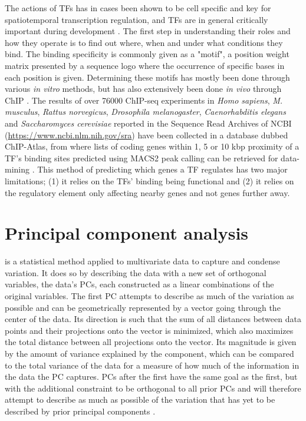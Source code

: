 The actions of \acp{TF} has in cases been shown to be cell specific and key for spatiotemporal transcription regulation, and \acp{TF} are in general critically important during development \cite{Spitz2012, Gurdon2016}. The first step in understanding their roles and how they operate is to  find out where, when and under what conditions they bind. The binding specificity is commonly given as a "motif", a position weight matrix presented by a sequence logo where the occurrence of specific bases in each position is given. Determining these motifs has mostly been done through various \textit{in vitro} methods, but has also extensively been done \textit{in vivo} through \ac{ChIP} \cite{lambert2018}. The results of over 76000 \ac{ChIP-seq} experiments in \textit{Homo sapiens}, \textit{M. musculus}, \textit{Rattus norvegicus}, \textit{Drosophila melanogaster}, \textit{Caenorhabditis elegans} and \textit{Saccharomyces cerevisiae} reported in the Sequence Read Archives of NCBI (\url{https://www.ncbi.nlm.nih.gov/sra}) have been collected in a database dubbed ChIP-Atlas, from where lists of coding genes within 1, 5 or 10 kbp proximity of a \ac{TF}'s binding sites predicted using MACS2 peak calling can be retrieved for data-mining \cite{Oki2018}. This method of predicting which genes a \ac{TF} regulates has two major limitations; (1) it relies on the \acp{TF}' binding being functional and (2) it relies on the regulatory element only affecting nearby genes and not genes further away.

\section{Principal component analysis}
 is a statistical method applied to multivariate data to capture and condense variation. It does so by describing the data with a new set of orthogonal variables, the data's \acp{PC}, each constructed as a linear combinations of the original variables. The first \ac{PC} attempts to describe as much of the variation as possible and can be geometrically represented by a vector going through the center of the data. Its direction is such that the sum of all distances between data points and their projections onto the vector is minimized, which also maximizes the total distance between all projections onto the vector. Its magnitude is given by the amount of variance explained by the component, which can be compared to the total variance of the data for a measure of how much of the information in the data the \ac{PC} captures. \acp{PC} after the first have the same goal as the first, but with the additional constraint to be orthogonal to all prior \acp{PC} and will therefore attempt to describe as much as possible of the variation that has yet to be described by prior principal components \cite{Abdi2010}. 

